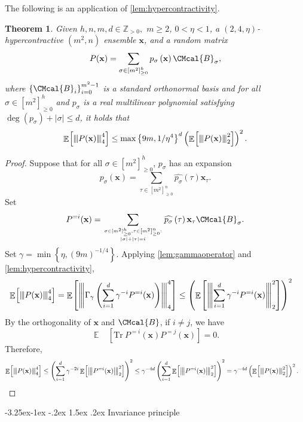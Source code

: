 \documentclass[10pt,a4paper]{article}
\makeatletter
\renewcommand{\subsection}{\@startsection{subsection}{2}{\z@}%
             {-3.25ex\@plus -1ex \@minus -.2ex}%
             {1.5ex \@plus .2ex}%
             {\normalfont\large\scshape\bfseries}}
\def\B{\CMcal{B}}
\theoremstyle{plain}
\newtheorem{theorem}{Theorem}[section]
\theoremstyle{definition}
\newcommand {\minusspace} {\: \! \!}
\newcommand {\Fn} [2] {\ensuremath{ #1 \minusspace \Br{ #2 } }}
\newcommand {\set} [1] {\ensuremath{ \left\lbrace #1 \right\rbrace }}
\newcommand {\br} [1] {\ensuremath{ \left( #1 \right) }}
\newcommand {\Br} [1] {\ensuremath{ \left[ #1 \right] }}
\newcommand {\ab} [1] {\ensuremath{ \left| #1 \right| }}
\DeclareMathOperator*{\bigE}{\mathbb{E}}
\newcommand {\expec} [2] {\Fn{\bigE_{\substack{#1}}}{#2}}
\newcommand{\nnorm}[1]{{\left\vert\kern-0.25ex\left\vert\kern-0.25ex\left\vert #1
		\right\vert\kern-0.25ex\right\vert\kern-0.25ex\right\vert}}
\newcommand {\Tr} {\ensuremath{ \mathrm{Tr} }}
\newcommand{\posint}{{\mathbb Z}_{>0}}
\newcommand{\randx}{\ensuremath{\mathbf{x}}}
\newcommand{\1}{\mathbb{1}} %
\makeatother
\begin{document}
	The following is an application of \cref{lem:hypercontractivity}.
	\begin{theorem}\label{lem:hybridHC}
		Given $h,n,m,d\in\posint,$ $m\geq 2$, $0<\eta<1$, a $(2,4,\eta)$-hypercontractive  $(m^2,n)$ ensemble $\randx$, and a random matrix
 \begin{equation*}
P(\randx)=\sum_{\sigma\in\Br{m^2}_{\geq0}^h}p_\sigma\br{\randx}\B_\sigma,
	\end{equation*}
	where $\set{\B_i}_{i=0}^{m^2-1}$ is a standard orthonormal basis and for all $\sigma\in\Br{m^2}_{\geq0}^h$ and $p_\sigma$ is a real multilinear polynomial satisfying $\deg\br{p_\sigma}+\ab{\sigma}\leq d$, it holds that
   \[\expec{}{\nnorm{P(\randx)}_4^4}\leq\max\set{9m,1/\eta^4}^d\br{\expec{}{\nnorm{P(\randx)}_2^2}}^2.\]
	\end{theorem}
	\begin{proof}
	Suppose that for all $\sigma\in[m^2]_{\geq0}^h$, $p_\sigma$ has an expansion
\[p_\sigma(\randx)=\sum_{\tau\in\Br{m^2}_{\geq0}^n}\widehat{p_\sigma}(\tau)\randx_\tau.\]
		 Set $$P^{=i}(\randx)=\sum_{\genfrac{}{}{0pt}{}{\sigma\in[m^2]_{\geq0}^h,\tau\in\Br{m^2}_{\geq0}^n :}{\ab{\sigma}+\ab{\tau}=i}}\widehat{p_{\sigma}}\br{\tau}\randx_\tau\B_{\sigma}.$$
	 Set $\gamma=\min\set{\eta,\br{9m}^{-1/4}}$. Applying \cref{lem:gammaoperator} and \cref{lem:hypercontractivity},
		\begin{align*} \expec{}{\nnorm{P(\randx)}_4^4}&= \expec{}{\nnorm{\Gamma_{\gamma}\br{\sum_{i=1}^{d}\gamma^{-i} P^{=i}(\randx)}}_4^4}\leq \br{\expec{}{\nnorm{\sum_{i=1}^{d}\gamma^{-i} P^{=i}(\randx)}^2_2}}^{2}
		\end{align*}
		By the orthogonality of $\randx$ and $\B$, if $i\ne j$, we have
		\[\expec{}{\Tr~P^{=i}(\randx)P^{=j}(\randx)}=0.\]
		Therefore,
\begin{align*}
\expec{}{\nnorm{P(\randx)}_4^4}&\leq\br{\sum_{i=1}^{d}\gamma^{-2i}\expec{}{\nnorm{P^{=i}(\randx)}^2_2}}^{2}\leq\gamma^{-4d}\br{\sum_{i=1}^{d}\expec{}{\nnorm{P^{=i}(\randx)}^2_2}}^{2}=\gamma^{-4d}\br{\expec{}{\nnorm{P(\randx)}_2^2}}^2.
\end{align*}
		
	\end{proof}
	
\subsection{Invariance principle}
\end{document}
